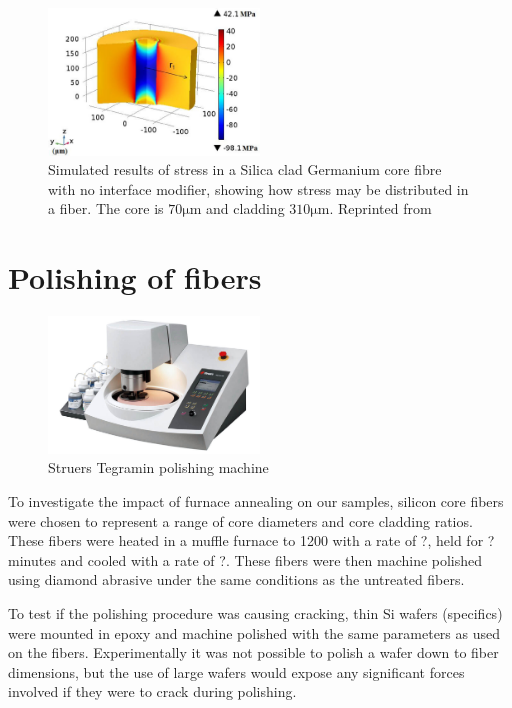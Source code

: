 \begin{figure}[h]
    \centering
    \includegraphics[width=0.5\textwidth]{fig/polishing/stress_simulation.png}
    \caption{Simulated results of stress in a Silica clad Germanium core fibre with no interface modifier, showing how stress may be distributed in a fiber. The core is $70\si{\micro\meter}$ and cladding $310\si{\micro\meter}$. Reprinted from \cite{Zhao2017EffectFiber}}
    \label{fig:my_label}
\end{figure}

\section{Polishing of fibers }



\begin{figure}[h!]
    \centering
    \includegraphics[width=0.5\textwidth]{fig/polishing/Tegramin.jpg}
    \caption{Struers Tegramin polishing machine}
    \label{fig:tegramin}
\end{figure}




To investigate the impact of furnace annealing on our samples, silicon core fibers were chosen to represent a range of core diameters and core cladding ratios. These fibers were heated in a muffle furnace to 1200 with a rate of ?, held for ? minutes and cooled with a  rate of ?. These fibers were then machine polished using diamond abrasive under the same conditions as the untreated fibers. 

To test if the polishing procedure was causing cracking, thin Si wafers (specifics) were mounted in epoxy and machine polished with the same parameters as used on the fibers. Experimentally it was not possible to polish a wafer down to fiber dimensions, but the use of large wafers would expose any significant forces involved if they were to crack during polishing.

